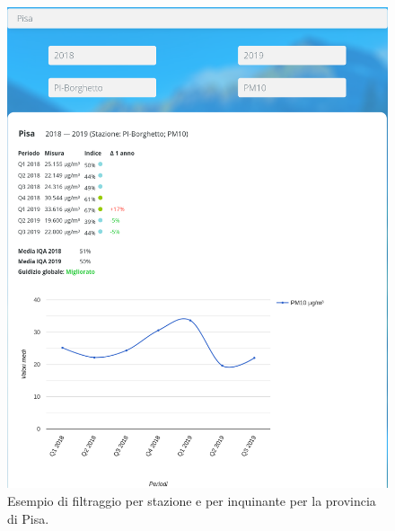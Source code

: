 \begin{figure}[p]
	\centering
	\includegraphics[width=\textwidth]{img/filtering}
	\caption{Esempio di filtraggio per stazione e per inquinante per la
	provincia di Pisa.}\label{fig:filtering}
\end{figure}
